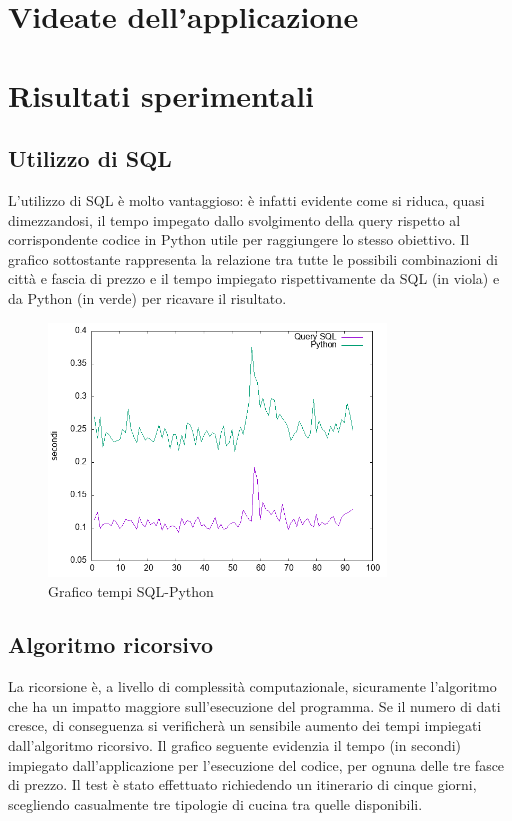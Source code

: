 \documentclass{report}
\begin{document}
\chapter{Videate dell'applicazione}\label{cap_videate}


\chapter{Risultati sperimentali}\label{cap_risultati}

\section{Utilizzo di SQL}
L'utilizzo di SQL è molto vantaggioso: è infatti evidente come si riduca, quasi dimezzandosi, il tempo impegato dallo svolgimento della query rispetto al corrispondente codice in Python utile per raggiungere lo stesso obiettivo. Il grafico sottostante rappresenta la relazione tra tutte le possibili combinazioni di città e fascia di prezzo e il tempo impiegato rispettivamente da SQL (in viola) e da Python (in verde) per ricavare il risultato.
\begin{figure}[h]
    \centering
    \includegraphics[width=0.8\textwidth]{images/graficoTempiTesi.png}
    \caption{Grafico tempi SQL-Python}
\end{figure}

\section{Algoritmo ricorsivo}
La ricorsione è, a livello di complessità computazionale, sicuramente l'algoritmo che ha un impatto maggiore sull'esecuzione del programma. Se il numero di dati cresce, di conseguenza si verificherà un sensibile aumento dei tempi impiegati dall'algoritmo ricorsivo. Il grafico seguente evidenzia il tempo (in secondi) impiegato dall'applicazione per l'esecuzione del codice, per ognuna delle tre fasce di prezzo. Il test è stato effettuato richiedendo un itinerario di cinque giorni, scegliendo casualmente tre tipologie di cucina tra quelle disponibili.
\end{document}
